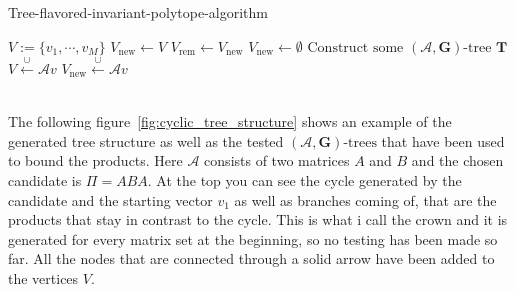 \vspace{1cm}

\begin{algorithm}
  \caption{Tree-flavored-invariant-polytope-algorithm}
  \label{alg:hybrid}
  \begin{algorithmic}
      \State $V := \{v_1, \cdots, v_M\}$
      \State $V_{\text{new}} \gets V$
          \State $V_{\text{rem}} \gets V_{\text{new}}$
          \State $V_{\text{new}} \gets \emptyset$
              \State $\text{Construct some } (\mathcal{A},\mathbf{G})\text{-tree } \mathbf{T}$
                  \State $V \xleftarrow{\cup}\mathcal{A} v$
                  \State $V_{\text{new}} \xleftarrow{\cup} \mathcal{A}v$
              \EndIf  
          \EndFor
      \EndWhile \\
      \Return \\
  \end{algorithmic}
\end{algorithm}

\vspace{1cm}

The following figure~\ref{fig:cyclic_tree_structure} shows an example of the generated tree structure as well as the tested $(\mathcal{A},\mathbf{G})\text{-trees}$ that have been used to bound the products. Here $\mathcal{A}$ consists of two matrices $A$ and $B$ and the chosen candidate is $ \Pi = ABA$. At the top you can see the cycle generated by the candidate and the starting vector $v_1$ as well as branches coming of, that are the products that stay in contrast to the cycle. This is what i call the crown and it is generated for every matrix set at the beginning, so no testing has been made so far. All the nodes that are connected through a solid arrow have been added to the vertices $V$.

